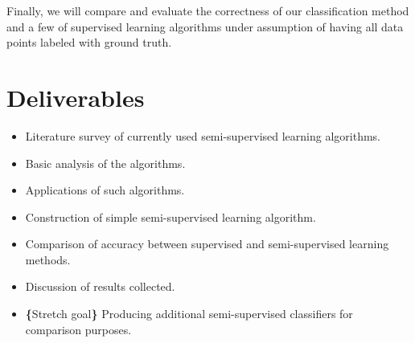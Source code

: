 Finally, we will compare and evaluate the correctness of our classification method and a few of supervised learning algorithms under assumption of having all data points labeled with ground truth.



\section*{Deliverables}
\begin{itemize}
\item Literature survey of currently used semi-supervised learning algorithms.
\item Basic analysis of the algorithms.
\item Applications of such algorithms.
\vspace{30pt}
\item Construction of simple semi-supervised learning algorithm.
\item Comparison of accuracy between supervised and semi-supervised learning methods.
\item Discussion of results collected.
\item \textbf{\{}Stretch goal\textbf{\}} Producing additional semi-supervised classifiers for comparison purposes.\
\end{itemize}





% 
